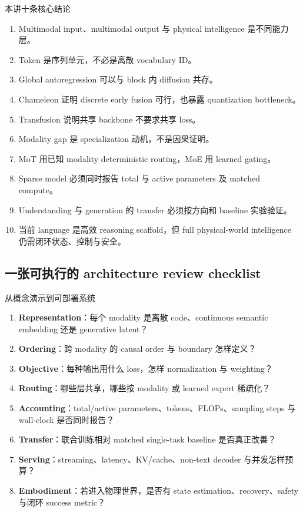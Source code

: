 \begin{importantbox}{本讲十条核心结论}
\begin{enumerate}
  \item Multimodal input、multimodal output 与 physical intelligence 是不同能力层。
  \item Token 是序列单元，不必是离散 vocabulary ID。
  \item Global autoregression 可以与 block 内 diffusion 共存。
  \item Chameleon 证明 discrete early fusion 可行，也暴露 quantization bottleneck。
  \item Transfusion 说明共享 backbone 不要求共享 loss。
  \item Modality gap 是 specialization 动机，不是因果证明。
  \item MoT 用已知 modality deterministic routing，MoE 用 learned gating。
  \item Sparse model 必须同时报告 total 与 active parameters 及 matched compute。
  \item Understanding 与 generation 的 transfer 必须按方向和 baseline 实验验证。
  \item 当前 language 是高效 reasoning scaffold，但 full physical-world intelligence 仍需闭环状态、控制与安全。
\end{enumerate}
\end{importantbox}

\subsection{一张可执行的 architecture review checklist}

\begin{knowledgebox}{从概念演示到可部署系统}
\begin{enumerate}
  \item \textbf{Representation}：每个 modality 是离散 code、continuous semantic embedding 还是 generative latent？
  \item \textbf{Ordering}：跨 modality 的 causal order 与 boundary 怎样定义？
  \item \textbf{Objective}：每种输出用什么 loss，怎样 normalization 与 weighting？
  \item \textbf{Routing}：哪些层共享，哪些按 modality 或 learned expert 稀疏化？
  \item \textbf{Accounting}：total/active parameters、tokens、FLOPs、sampling steps 与 wall-clock 是否同时报告？
  \item \textbf{Transfer}：联合训练相对 matched single-task baseline 是否真正改善？
  \item \textbf{Serving}：streaming、latency、KV/cache、non-text decoder 与并发怎样预算？
  \item \textbf{Embodiment}：若进入物理世界，是否有 state estimation、recovery、safety 与闭环 success metric？
\end{enumerate}
\end{knowledgebox}

